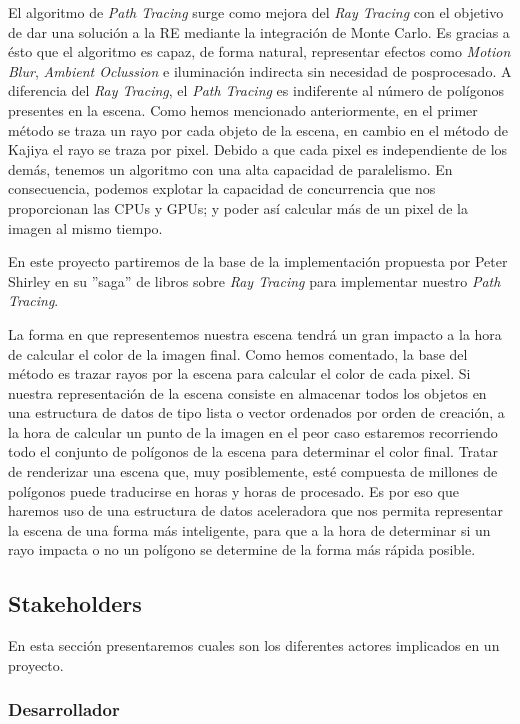 \documentclass[titlepage,12pt]{report}
\begin{document}
El algoritmo de \textit{Path Tracing} surge como mejora del \textit{Ray Tracing} con el objetivo de dar una solución a la RE mediante la integración de Monte Carlo. Es gracias a ésto que el algoritmo es capaz, de forma natural, representar efectos como \textit{Motion Blur}, \textit{Ambient Oclussion} e iluminación indirecta sin necesidad de posprocesado. A diferencia del \textit{Ray Tracing}, el \textit{Path Tracing} es indiferente al número de polígonos presentes en la escena. Como hemos mencionado anteriormente, en el primer método se traza un rayo por cada objeto de la escena, en cambio en el método de Kajiya el rayo se traza por pixel. Debido a que cada pixel es independiente de los demás, tenemos un algoritmo con una alta capacidad de paralelismo. En consecuencia, podemos explotar la capacidad de concurrencia que nos proporcionan las CPUs y GPUs; y poder así calcular más de un pixel de la imagen al mismo tiempo.

En este proyecto partiremos de la base de la implementación propuesta por Peter Shirley en su ''saga'' de libros sobre \textit{Ray Tracing} \citep{Shirley2018a, Shirley2018b, Shirley2018b} para implementar nuestro \textit{Path Tracing}. 

La forma en que representemos nuestra escena tendrá un gran impacto a la hora de calcular el color de la imagen final. Como hemos comentado, la base del método es trazar rayos por la escena para calcular el color de cada pixel. Si nuestra representación de la escena consiste en almacenar todos los objetos en una estructura de datos de tipo lista o vector ordenados por orden de creación, a la hora de calcular un punto de la imagen en el peor caso estaremos recorriendo todo el conjunto de polígonos de la escena para determinar el color final. Tratar de renderizar una escena que, muy posiblemente, esté compuesta de millones de polígonos puede traducirse en horas y horas de procesado. Es por eso que haremos uso de una estructura de datos aceleradora que nos permita representar la escena de una forma más inteligente, para que a la hora de determinar si un rayo impacta o no un polígono se determine de la forma más rápida posible.

\subsection{Stakeholders}

En esta sección presentaremos cuales son los diferentes actores implicados en un proyecto.

\subsubsection{Desarrollador}
\end{document}
